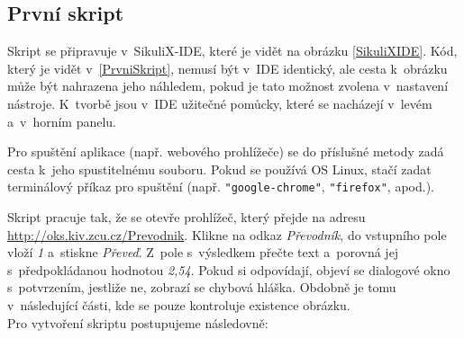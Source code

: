 		\subsection{První skript}
		Skript se připravuje v~SikuliX-IDE, které je vidět na obrázku \ref{SikuliXIDE}. Kód, který je vidět v~\ref{PrvniSkript}, nemusí být v~IDE identický, ale cesta k~obrázku může být nahrazena jeho náhledem, pokud je tato možnost zvolena v~nastavení nástroje. K~tvorbě jsou v~IDE užitečné pomůcky, které se nacházejí v~levém a~v~horním panelu.
		
		Pro spuštění aplikace (např. webového prohlížeče) se do příslušné metody zadá cesta k~jeho spustitelnému souboru. Pokud se používá OS Linux, stačí zadat terminálový příkaz pro spuštění (např. \texttt{"google-chrome"}, \texttt{"firefox"}, apod.).
		
		Skript pracuje tak, že se otevře prohlížeč, který přejde na adresu \url{http://oks.kiv.zcu.cz/Prevodnik}. Klikne na odkaz \emph{Převodník}, do vstupního pole vloží \emph{1} a~stiskne \emph{Převeď}. Z~pole s~výsledkem přečte text a~porovná jej s~předpokládanou hodnotou \emph{2,54}. Pokud si odpovídají, objeví se dialogové okno s~potvrzením, jestliže ne, zobrazí se chybová hláška. Obdobně je tomu v~následující části, kde se pouze kontroluje existence obrázku.
		\\[\topsep]Pro vytvoření skriptu postupujeme následovně:
		\vspace{-\topsep}
